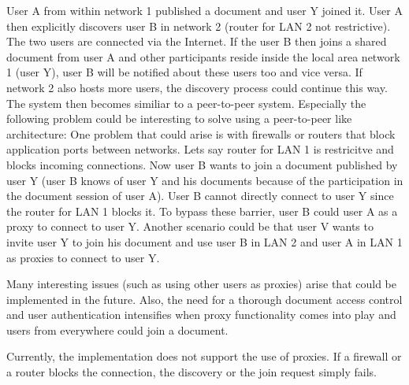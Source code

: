 User A from within network 1 published a document and user Y joined it. User A then explicitly discovers user B in network 2 (router for LAN 2 not restrictive). The two users are connected via the Internet. If the user B then joins a shared document from user A and other participants reside inside the local area network 1 (user Y), user B will be notified about these users too and vice versa. If network 2 also hosts more users, the discovery process could continue this way. The system then becomes similiar to a peer-to-peer system. Especially the following problem could be interesting to solve using a peer-to-peer like architecture: One problem that could arise is with firewalls or routers that block application ports between networks. Lets say router for LAN 1 is restricitve and blocks incoming connections. Now user B wants to join a document published by user Y (user B knows of user Y and his documents because of the participation in the document session of user A). User B cannot directly connect to user Y since the router for LAN 1 blocks it. To bypass these barrier, user B could user A as a proxy to connect to user Y.
Another scenario could be that user V wants to invite user Y to join his document and use user B in LAN 2 and user A in LAN 1 as proxies to connect to user Y. 

Many interesting issues (such as using other users as proxies) arise that could be implemented in the future. Also, the need for a thorough document access control and user authentication intensifies when proxy functionality comes into play and users from everywhere could join a document.

Currently, the implementation does not support the use of proxies. If a firewall or a router blocks the connection,  the discovery or the join request simply fails.